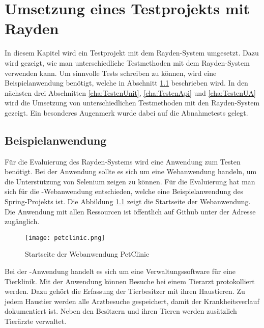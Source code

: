 \chapter{Umsetzung eines Testprojekts mit Rayden}
\label{cha:Testen}

In diesem Kapitel wird ein Testprojekt mit dem Rayden-System umgesetzt. Dazu wird gezeigt, wie man unterschiedliche Testmethoden mit dem Rayden-System verwenden kann. Um sinnvolle Tests schreiben zu können, wird eine Beispielanwendung benötigt, welche in Abschnitt \ref{cha:demoapp} beschrieben wird. In den nächsten drei Abschnitten \ref{cha:TestenUnit}, \ref{cha:TestenApi} und \ref{cha:TestenUA} wird die Umsetzung von unterschiedlichen Testmethoden mit den Rayden-System gezeigt. Ein besonderes Augenmerk wurde dabei auf die Abnahmetests gelegt.


\section{Beispielanwendung}
\label{cha:demoapp}

Für die Evaluierung des Rayden-Systems wird eine Anwendung zum Testen benötigt. Bei der Anwendung sollte es sich um eine Webanwendung handeln, um die Unterstützung von Selenium zeigen zu können. Für die Evaluierung hat man sich für die -Webanwendung entschieden, welche eine Beispielanwendung des Spring-Projekts ist. Die Abbildung \ref{fig:petClinicPage} zeigt die Startseite der Webanwendung. Die Anwendung mit allen Ressourcen ist öffentlich auf Github unter der Adresse  zugänglich.

\begin{figure}
\centering
\texttt{[image: petclinic.png]}
\caption{Startseite der Webanwendung PetClinic}
\label{fig:petClinicPage}
\end{figure}

\SuperPar
Bei der -Anwendung handelt es sich um eine Verwaltungssoftware für eine Tierklinik. Mit der Anwendung können Besuche bei einem Tierarzt protokolliert werden. Dazu gehört die Erfassung der Tierbesitzer mit ihren Haustieren. Zu jedem Haustier werden alle Arztbesuche gespeichert, damit der Krankheitsverlauf dokumentiert ist. Neben den Besitzern und ihren Tieren werden zusätzlich Tierärzte verwaltet. 

